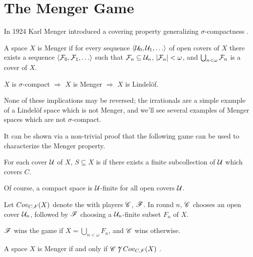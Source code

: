 
\chapter{The Menger Game}

In 1924 Karl Menger introduced a covering property generalizing
$\sigma$-compactness \cite{custom31879423}.

\begin{defn}
  A space $X$ is Menger if for every sequence $\<\mc U_0,\mc U_1,\dots\>$
  of open covers of $X$ there exists a sequence
  $\<\mc F_0,\mc F_1,\dots\>$ such that $\mathcal{F}_n\subseteq \mathcal{U}_n$,
  $|\mathcal{F}_n|<\omega$, and $\bigcup_{n<\omega}\mathcal{F}_n$ is a cover of $X$.
\end{defn}

\begin{prop}
  $X$ is $\sigma$-compact
    $\Rightarrow$
  $X$ is Menger
    $\Rightarrow$
  $X$ is Lindel\"of.
\end{prop}

None of these implications may be reversed; the irrationals are a simple example
of a Lindel\"of space which is not Menger, and we'll see several examples of
Menger spaces which are not $\sigma$-compact.

It can be shown via a non-trivial
proof that the following game can be used to characterize the Menger property.

\begin{defn}
  For each cover $\mathcal{U}$ of $X$, $S\subseteq X$ is  if
  there exists a finite subcollection of $\mathcal{U}$ which covers $C$.
\end{defn}

Of course, a compact space is $\mathcal{U}$-finite for all open covers $\mathcal{U}$.

\begin{game}
  Let $Cov_{C,F}(X)$ denote the  with players $\mathscr{C}$, $\mathscr{F}$.
  In round $n$, $\mathscr{C}$ chooses an open cover $\mathcal{U}_n$, followed by $\mathscr{F}$
  choosing a $\mathcal{U}_n$-finite subset $F_n$ of $X$.

  $\mathscr{F}$ wins the game if $X = \bigcup_{n<\omega}F_n$,
  and $\mathscr{C}$ wins otherwise.
\end{game}

\begin{thm}
  A space $X$ is Menger if and only if $\mathscr{C}\not\uparrow Cov_{C,F}(X)$
  \cite{MR1544773}.
\end{thm}

